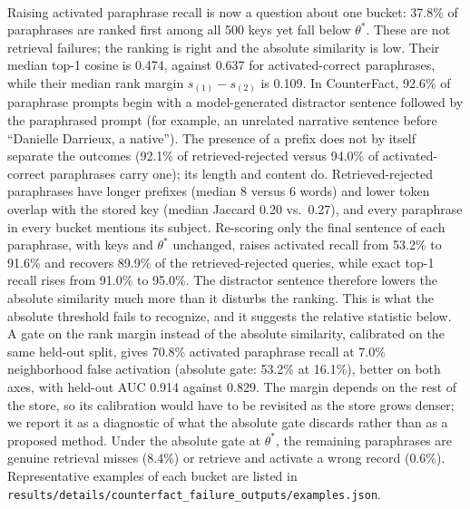 \documentclass[preprint,12pt]{elsarticle}
\newif\ifmarkchanges %
\newcommand{\rev}[1]{\ifmarkchanges{\color{blue}#1}\else#1\fi} %
\providecommand{\DIFaddtex}[1]{{\protect\color{blue}\uwave{#1}}} %
\providecommand{\DIFadd}[1]{\texorpdfstring{\DIFaddtex{#1}}{#1}} %
\begin{document}
\paragraph{\DIFadd{Where the gate fails}}
\rev{Raising activated paraphrase recall is now a question about one bucket: 37.8\% of paraphrases are ranked first among all 500 keys yet fall below $\theta^*$. These are not retrieval failures; the ranking is right and the absolute similarity is low. Their median top-1 cosine is 0.474, against 0.637 for activated-correct paraphrases, while their median rank margin $s_{(1)}-s_{(2)}$ is 0.109. In CounterFact, 92.6\% of paraphrase prompts begin with a model-generated distractor sentence followed by the paraphrased prompt (for example, an unrelated narrative sentence before ``Danielle Darrieux, a native''). The presence of a prefix does not by itself separate the outcomes (92.1\% of retrieved-rejected versus 94.0\% of activated-correct paraphrases carry one); its length and content do. Retrieved-rejected paraphrases have longer prefixes (median 8 versus 6 words) and lower token overlap with the stored key (median Jaccard 0.20 vs.\ 0.27), and every paraphrase in every bucket mentions its subject. Re-scoring only the final sentence of each paraphrase, with keys and $\theta^*$ unchanged, raises activated recall from 53.2\% to 91.6\% and recovers 89.9\% of the retrieved-rejected queries, while exact top-1 recall rises from 91.0\% to 95.0\%. The distractor sentence therefore lowers the absolute similarity much more than it disturbs the ranking. This is what the absolute threshold fails to recognize, and it suggests the relative statistic below. A gate on the rank margin instead of the absolute similarity, calibrated on the same held-out split, gives 70.8\% activated paraphrase recall at 7.0\% neighborhood false activation (absolute gate: 53.2\% at 16.1\%), better on both axes, with held-out AUC 0.914 against 0.829. The margin depends on the rest of the store, so its calibration would have to be revisited as the store grows denser; we report it as a diagnostic of what the absolute gate discards rather than as a proposed method. Under the absolute gate at $\theta^*$, the remaining paraphrases are genuine retrieval misses (8.4\%) or retrieve and activate a wrong record (0.6\%). Representative examples of each bucket are listed in \nolinkurl{results/details/counterfact_failure_outputs/examples.json}.}
\end{document}
